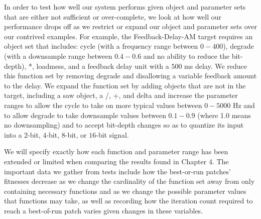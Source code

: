 \documentclass[a4paper,12pt]{report} 	%
\numberwithin{figure}{chapter}
\numberwithin{table}{chapter}
\numberwithin{equation}{chapter}
\begin{document}
\begin{flushleft}
In order to test how well our system performs given object and parameter sets that are either not sufficient or over-complete, we look at how well our performance drops off as we restrict or expand our object and parameter sets over our contrived examples. For example, the Feedback-Delay-AM target requires an object set that includes: cycle\texttildelow{} (with a frequency range between $0-400$), degrade\texttildelow{} (with a downsample range between $0.4 - 0.6$ and no ability to reduce the bit-depth), *\texttildelow{}, loadmess, and a feedback delay unit with a $500$ ms delay. We reduce this function set by removing degrade\texttildelow{} and disallowing a variable feedback amount to the delay. We expand the function set by adding objects that are not in the target, including a saw\texttildelow{} object, a /\texttildelow{}, +\texttildelow{}, and delta\texttildelow{} and increase the parameter ranges to allow the cycle\texttildelow{}  to take on more typical values between $0-5000$ Hz and to allow degrade\texttildelow{}  to take downsample values between $0.1-0.9$ (where 1.0 means no downsampling) and to accept bit-depth changes so as to quantize its input into a $2$-bit, $4$-bit, $8$-bit, or $16$-bit signal. 

We will specify exactly how each function and parameter range has been extended or limited when comparing the results found in Chapter 4. The important data we gather from tests include how the best-or-run patches' fitnesses decrease as we change the cardinality of the function set away from only containing necessary functions and as we change the possible parameter values that functions may take, as well as recording how the iteration count required to reach a best-of-run patch varies given changes in these variables.


\end{flushleft}
\end{document}
